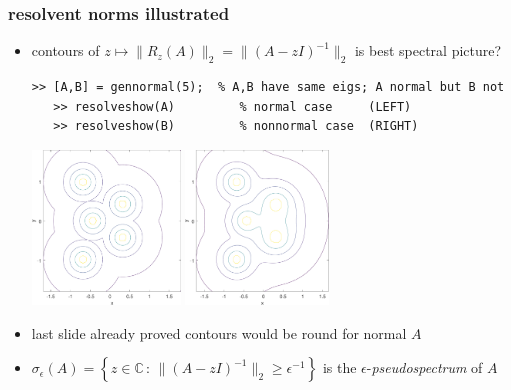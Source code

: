 \documentclass[10pt,hyperref]{beamer}
\newcommand{\CC}{\mathbb{C}}
\newcommand{\eps}{\epsilon}
\begin{document}
\begin{frame}[fragile]
\frametitle{resolvent norms illustrated}

\small
\begin{itemize}
\item contours of $z\mapsto\|R_z(A)\|_2= \|(A-z I)^{-1}\|_2$ is best spectral picture?

\begin{Verbatim}[fontsize=\footnotesize]
   >> [A,B] = gennormal(5);  % A,B have same eigs; A normal but B not
   >> resolveshow(A)         % normal case     (LEFT)
   >> resolveshow(B)         % nonnormal case  (RIGHT)
\end{Verbatim}

\begin{center}
\includegraphics[width=0.31\textwidth]{figs/resolvenormal} \hspace{20mm} \includegraphics[width=0.3\textwidth]{figs/resolvenonnormal}
\end{center}

\item last slide already proved contours would be round for normal $A$
\item $\sigma_\eps(A) = \left\{z\in\CC\,:\, \|(A-z I)^{-1}\|_2 \ge \eps^{-1}\right\}$ is the $\eps$-\emph{pseudospectrum} of $A$
\end{itemize}
\end{frame}
\end{document}
